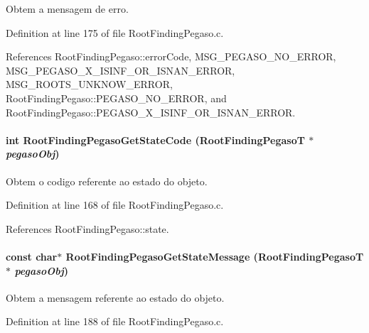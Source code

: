 Obtem a mensagem de erro. 



Definition at line 175 of file RootFindingPegaso.c.

References RootFindingPegaso::errorCode, MSG\_\-PEGASO\_\-NO\_\-ERROR, MSG\_\-PEGASO\_\-X\_\-ISINF\_\-OR\_\-ISNAN\_\-ERROR, MSG\_\-ROOTS\_\-UNKNOW\_\-ERROR, RootFindingPegaso::PEGASO\_\-NO\_\-ERROR, and RootFindingPegaso::PEGASO\_\-X\_\-ISINF\_\-OR\_\-ISNAN\_\-ERROR.\hypertarget{group____pegaso_g83892750b865aa977fcdba83922ad6fb}{
\paragraph[RootFindingPegasoGetStateCode]{\setlength{\rightskip}{0pt plus 5cm}int RootFindingPegasoGetStateCode ({\bf RootFindingPegasoT} $\ast$ {\em pegasoObj})}\hfill}
\label{group____pegaso_g83892750b865aa977fcdba83922ad6fb}


Obtem o codigo referente ao estado do objeto. 



Definition at line 168 of file RootFindingPegaso.c.

References RootFindingPegaso::state.\hypertarget{group____pegaso_g2328683ae067772b11e3127fe800448d}{
\paragraph[RootFindingPegasoGetStateMessage]{\setlength{\rightskip}{0pt plus 5cm}const char$\ast$ RootFindingPegasoGetStateMessage ({\bf RootFindingPegasoT} $\ast$ {\em pegasoObj})}\hfill}
\label{group____pegaso_g2328683ae067772b11e3127fe800448d}


Obtem a mensagem referente ao estado do objeto. 



Definition at line 188 of file RootFindingPegaso.c.

